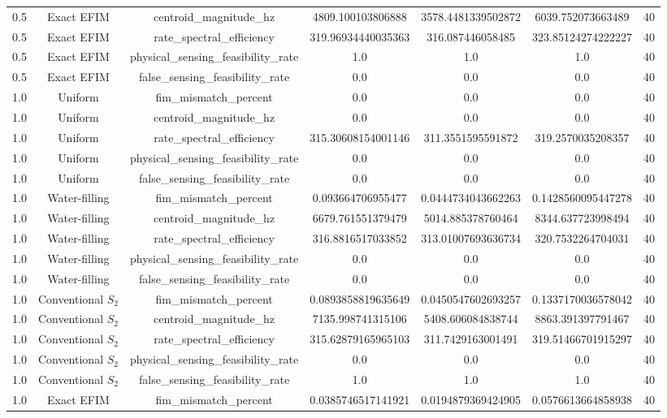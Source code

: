 \begin{table}[t]
\begin{tabular}{lcccccc}
0.5 & Exact EFIM & centroid_magnitude_hz & 4809.100103806888 & 3578.4481339502872 & 6039.752073663489 & 40 \\
0.5 & Exact EFIM & rate_spectral_efficiency & 319.96934440035363 & 316.087446058485 & 323.85124274222227 & 40 \\
0.5 & Exact EFIM & physical_sensing_feasibility_rate & 1.0 & 1.0 & 1.0 & 40 \\
0.5 & Exact EFIM & false_sensing_feasibility_rate & 0.0 & 0.0 & 0.0 & 40 \\
1.0 & Uniform & fim_mismatch_percent & 0.0 & 0.0 & 0.0 & 40 \\
1.0 & Uniform & centroid_magnitude_hz & 0.0 & 0.0 & 0.0 & 40 \\
1.0 & Uniform & rate_spectral_efficiency & 315.30608154001146 & 311.3551595591872 & 319.2570035208357 & 40 \\
1.0 & Uniform & physical_sensing_feasibility_rate & 0.0 & 0.0 & 0.0 & 40 \\
1.0 & Uniform & false_sensing_feasibility_rate & 0.0 & 0.0 & 0.0 & 40 \\
1.0 & Water-filling & fim_mismatch_percent & 0.093664706955477 & 0.0444734043662263 & 0.1428560095447278 & 40 \\
1.0 & Water-filling & centroid_magnitude_hz & 6679.761551379479 & 5014.885378760464 & 8344.637723998494 & 40 \\
1.0 & Water-filling & rate_spectral_efficiency & 316.8816517033852 & 313.01007693636734 & 320.7532264704031 & 40 \\
1.0 & Water-filling & physical_sensing_feasibility_rate & 0.0 & 0.0 & 0.0 & 40 \\
1.0 & Water-filling & false_sensing_feasibility_rate & 0.0 & 0.0 & 0.0 & 40 \\
1.0 & Conventional $S_2$ & fim_mismatch_percent & 0.0893858819635649 & 0.0450547602693257 & 0.1337170036578042 & 40 \\
1.0 & Conventional $S_2$ & centroid_magnitude_hz & 7135.998741315106 & 5408.606084838744 & 8863.391397791467 & 40 \\
1.0 & Conventional $S_2$ & rate_spectral_efficiency & 315.62879165965103 & 311.7429163001491 & 319.51466701915297 & 40 \\
1.0 & Conventional $S_2$ & physical_sensing_feasibility_rate & 0.0 & 0.0 & 0.0 & 40 \\
1.0 & Conventional $S_2$ & false_sensing_feasibility_rate & 1.0 & 1.0 & 1.0 & 40 \\
1.0 & Exact EFIM & fim_mismatch_percent & 0.0385746517141921 & 0.0194879369424905 & 0.0576613664858938 & 40 \\

\end{tabular}
\end{table}
